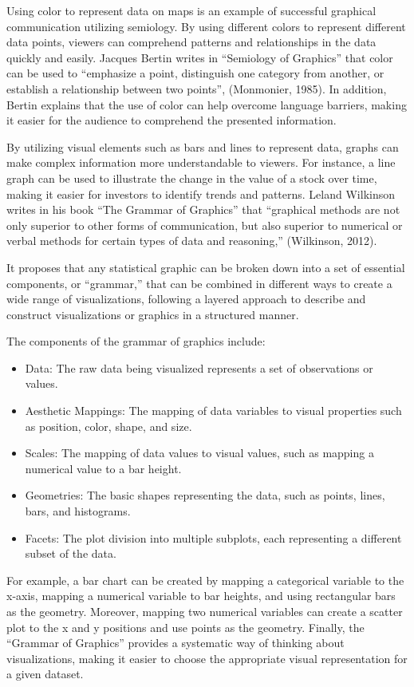 \documentclass[print]{nuthesis}
\begin{document}
Using color to represent data on maps is an example of successful graphical communication utilizing semiology.
By using different colors to represent different data points, viewers can comprehend patterns and relationships in the data quickly and easily.
Jacques Bertin writes in ``Semiology of Graphics'' that color can be used to ``emphasize a point, distinguish one category from another, or establish a relationship between two points'', (Monmonier, 1985).
In addition, Bertin explains that the use of color can help overcome language barriers, making it easier for the audience to comprehend the presented information.

By utilizing visual elements such as bars and lines to represent data, graphs can make complex information more understandable to viewers.
For instance, a line graph can be used to illustrate the change in the value of a stock over time, making it easier for investors to identify trends and patterns. Leland Wilkinson writes in his book ``The Grammar of Graphics'' that ``graphical methods are not only superior to other forms of communication, but also superior to numerical or verbal methods for certain types of data and reasoning,'' (Wilkinson, 2012).

It proposes that any statistical graphic can be broken down into a set of essential components, or ``grammar,'' that can be combined in different ways to create a wide range of visualizations, following a layered approach to describe and construct visualizations or graphics in a structured manner.

The components of the grammar of graphics include:

\begin{itemize}
\item
  Data: The raw data being visualized represents a set of observations or values.
\item
  Aesthetic Mappings: The mapping of data variables to visual properties such as position, color, shape, and size.
\item
  Scales: The mapping of data values to visual values, such as mapping a numerical value to a bar height.
\item
  Geometries: The basic shapes representing the data, such as points, lines, bars, and histograms.
\item
  Facets: The plot division into multiple subplots, each representing a different subset of the data.
\end{itemize}

For example, a bar chart can be created by mapping a categorical variable to the x-axis, mapping a numerical variable to bar heights, and using rectangular bars as the geometry.
Moreover, mapping two numerical variables can create a scatter plot to the x and y positions and use points as the geometry.
Finally, the ``Grammar of Graphics'' provides a systematic way of thinking about visualizations, making it easier to choose the appropriate visual representation for a given dataset.
\end{document}
